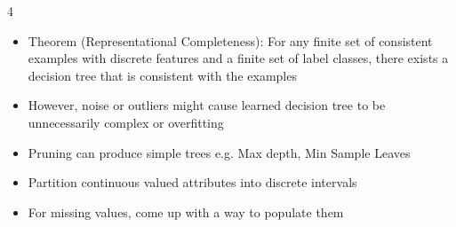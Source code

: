 \documentclass[10pt, landscape]{article}
\begin{document}
\begin{multicols*}{4}
\begin{itemize}
    \item Theorem (Representational Completeness): For any finite set of consistent examples with discrete features and a finite set of label classes, there exists a decision tree that is consistent with the examples
    \item However, noise or outliers might cause learned decision tree to be unnecessarily complex or overfitting
    \item Pruning can produce simple trees e.g. Max depth, Min Sample Leaves
    \item Partition continuous valued attributes into discrete intervals
    \item For missing values, come up with a way to populate them
\end{itemize}


\end{multicols*}
\end{document}
